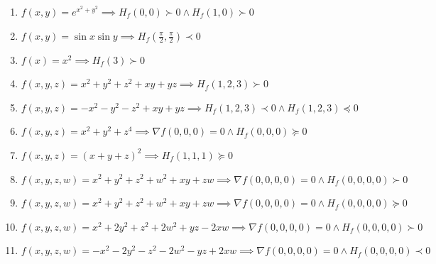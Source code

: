\documentclass[11pt,a4paper]{article}
\begin{document}
\begin{enumerate}
\item $\displaystyle f(x, y) = e^{x^{2} + y^{2}} \implies H_{f}(0, 0) \succ 0 \land H_{f}(1, 0) \succ 0$
\item $\displaystyle f(x, y) = \sin x \sin y \implies H_{f}\left( \frac{\pi}{2}, \frac{\pi}{2} \right) \prec 0$
\item $\displaystyle f(x) = x^{2} \implies H_{f}(3) \succ 0$
\item $\displaystyle f(x, y, z) = x^{2} + y^{2} + z^{2} + xy + yz \implies H_{f}(1, 2, 3) \succ 0$
\item $\displaystyle f(x, y, z) = -x^{2} - y^{2} - z^{2} + xy + yz \implies H_{f}(1, 2, 3) \prec 0 \land H_{f}(1, 2, 3) \preceq 0$
\item $\displaystyle f(x, y, z) = x^{2} + y^{2} + z^{4} \implies \nabla f(0, 0, 0) = 0 \land H_{f}(0, 0, 0) \succeq 0$
\item $\displaystyle f(x, y, z) = (x + y + z)^{2} \implies H_{f}(1, 1, 1) \succeq 0$
\item $\displaystyle f(x, y, z, w) = x^{2} + y^{2} + z^{2} + w^{2} + xy + zw \implies \nabla f(0, 0, 0, 0) = 0 \land H_{f}(0, 0, 0, 0) \succ 0$
\item $\displaystyle f(x, y, z, w) = x^{2} + y^{2} + z^{2} + w^{2} + xy + zw \implies \nabla f(0, 0, 0, 0) = 0 \land H_{f}(0, 0, 0, 0) \succeq 0$
\item $\displaystyle f(x, y, z, w) = x^{2} + 2y^{2} + z^{2} + 2w^{2} + yz - 2xw \implies \nabla f(0, 0, 0, 0) = 0 \land H_{f}(0, 0, 0, 0) \succ 0$
\item $\displaystyle f(x, y, z, w) = -x^{2} - 2y^{2} - z^{2} - 2w^{2} - yz + 2xw \implies \nabla f(0, 0, 0, 0) = 0 \land H_{f}(0, 0, 0, 0) \prec 0$
\end{enumerate}
\end{document}
